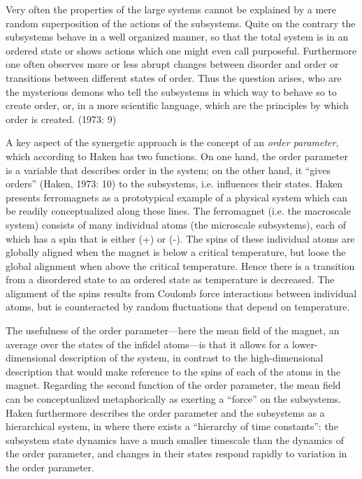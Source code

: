 Very often the properties of the large systems cannot be explained by a mere random superposition of the actions of the subsystems. Quite on the contrary the subsystems behave in a well organized manner, so that the total system is in an ordered state or shows actions which one might even call purposeful. Furthermore one often observes more or less abrupt changes between disorder and order or transitions between different states of order. Thus the question arises, who are the mysterious demons who tell the subsystems in which way to behave so to create order, or, in a more scientific language, which are the principles by which order is created. (1973: 9)

A key aspect of the synergetic approach is the concept of an \textit{order parameter}, which according to Haken has two functions. On one hand, the order parameter is a variable that describes order in the system; on the other hand, it “gives orders” (Haken, 1973: 10) to the subsystems, i.e. influences their states. Haken presents ferromagnets as a prototypical example of a physical system which can be readily conceptualized along these lines. The ferromagnet (i.e. the macroscale system) consists of many individual atoms (the microscale subsystems), each of which has a spin that is either (+) or (-). The spins of these individual atoms are globally aligned when the magnet is below a critical temperature, but loose the global alignment when above the critical temperature. Hence there is a transition from a disordered state to an ordered state as temperature is decreased. The alignment of the spins results from Coulomb force interactions between individual atoms, but is counteracted by random fluctuations that depend on temperature. 

The usefulness of the order parameter—here the mean field of the magnet, an average over the states of the infidel atoms—is that it allows for a lower-dimensional description of the system, in contrast to the high-dimensional description that would make reference to the spins of each of the atoms in the magnet. Regarding the second function of the order parameter, the mean field can be conceptualized metaphorically as exerting a “force” on the subsystems. Haken furthermore describes the order parameter and the subsystems as a hierarchical system, in where there exists a “hierarchy of time constants”: the subsystem state dynamics have a much smaller timescale than the dynamics of the order parameter, and changes in their states respond rapidly to variation in the order parameter. 

